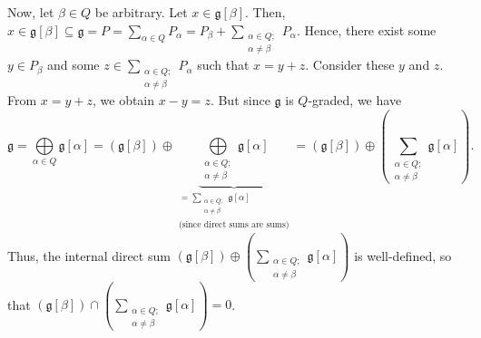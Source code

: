 \documentclass[etingof-lie.tex]{subfiles}
\begin{document}
\begin{verlong}
Now, let $\beta\in Q$ be arbitrary. Let $x\in\mathfrak{g}\left[  \beta\right]
$. Then, $x\in\mathfrak{g}\left[  \beta\right]  \subseteq\mathfrak{g}%
=P=\sum\limits_{\alpha\in Q}P_{\alpha}=P_{\beta}+\sum\limits_{\substack{\alpha
\in Q;\\\alpha\neq\beta}}P_{\alpha}$. Hence, there exist some $y\in P_{\beta}$
and some $z\in\sum\limits_{\substack{\alpha\in Q;\\\alpha\neq\beta}}P_{\alpha
}$ such that $x=y+z$. Consider these $y$ and $z$. From $x=y+z$, we obtain
$x-y=z$. But since $\mathfrak{g}$ is $Q$-graded, we have
\[
\mathfrak{g}=\bigoplus\limits_{\alpha\in Q}\mathfrak{g}\left[  \alpha\right]
=\left(  \mathfrak{g}\left[  \beta\right]  \right)  \oplus
\underbrace{\bigoplus\limits_{\substack{\alpha\in Q;\\\alpha\neq\beta
}}\mathfrak{g}\left[  \alpha\right]  }_{\substack{=\sum
\limits_{\substack{\alpha\in Q;\\\alpha\neq\beta}}\mathfrak{g}\left[
\alpha\right]  \\\text{(since direct sums are sums)}}}=\left(  \mathfrak{g}%
\left[  \beta\right]  \right)  \oplus\left(  \sum\limits_{\substack{\alpha\in
Q;\\\alpha\neq\beta}}\mathfrak{g}\left[  \alpha\right]  \right)  .
\]
Thus, the internal direct sum $\left(  \mathfrak{g}\left[  \beta\right]
\right)  \oplus\left(  \sum\limits_{\substack{\alpha\in Q;\\\alpha\neq\beta
}}\mathfrak{g}\left[  \alpha\right]  \right)  $ is well-defined, so that
$\left(  \mathfrak{g}\left[  \beta\right]  \right)  \cap\left(  \sum
\limits_{\substack{\alpha\in Q;\\\alpha\neq\beta}}\mathfrak{g}\left[
\alpha\right]  \right)  =0$.


\end{verlong}
\end{document}
